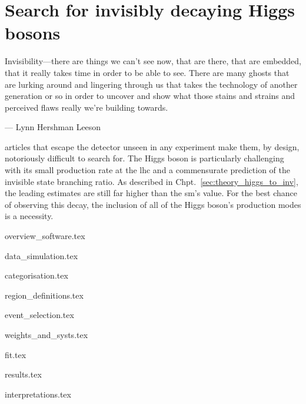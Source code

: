 \chapter{Search for invisibly decaying Higgs bosons}
\label{chap:higgstoinv}

\epigraph{Invisibility---there are things we can't see now, that are there, that are embedded, that it really takes time in order to be able to see. There are many ghosts that are lurking around and lingering through us that takes the technology of another generation or so in order to uncover and show what those stains and strains and perceived flaws really we're building towards.}{--- Lynn Hershman Leeson}

articles that escape the detector unseen in any experiment make them, by design, notoriously difficult to search for. The Higgs boson is particularly challenging with its small production rate at the \acrshort{lhc} and a commensurate prediction of the invisible state branching ratio. As described in Chpt.~\ref{sec:theory_higgs_to_inv}, the leading estimates are still far higher than the \acrlong{sm}'s value. For the best chance of observing this decay, the inclusion of all of the Higgs boson's production modes is a necessity.





{overview_software.tex}




{data_simulation.tex}




{categorisation.tex}




{region_definitions.tex}




{event_selection.tex}




{weights_and_systs.tex}




{fit.tex}




{results.tex}




{interpretations.tex}
